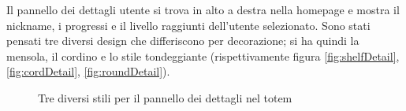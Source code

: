 Il pannello dei dettagli utente si trova in alto a destra nella homepage e mostra il nickname, i progressi e il livello raggiunti dell'utente selezionato. Sono stati pensati tre diversi design  che differiscono per decorazione; si ha quindi la mensola, il cordino e lo stile tondeggiante (rispettivamente figura \ref{fig:shelfDetail}, \ref{fig:cordDetail}, \ref{fig:roundDetail}).
\begin{figure}
    \centering
    \caption{Tre diversi stili per il pannello dei dettagli nel totem}
    \label{fig:detailBanner}
\end{figure}

